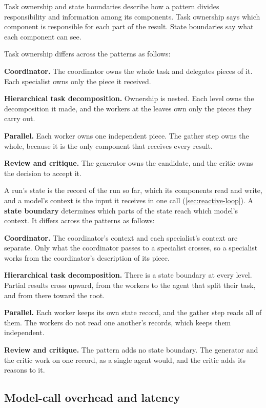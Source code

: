 Task ownership and state boundaries describe how a pattern divides responsibility and information
among its components. Task ownership says which component is responsible for each part of the
result. State boundaries say what each component can see.

Task ownership differs across the patterns as follows:
\bi
\item \textbf{Coordinator.} The coordinator owns the whole task and delegates pieces of it. Each
specialist owns only the piece it received.
\item \textbf{Hierarchical task decomposition.} Ownership is nested. Each level owns the
decomposition it made, and the workers at the leaves own only the pieces they carry out.
\item \textbf{Parallel.} Each worker owns one independent piece. The gather step owns the whole,
because it is the only component that receives every result.
\item \textbf{Review and critique.} The generator owns the candidate, and the critic owns the
decision to accept it.
\ei

A run's state is the record of the run so far, which its components read and write, and a model's
context is the input it receives in one call (\cref{sec:reactive-loop}). A \textbf{state boundary} determines which parts of the state reach which model's context. It differs
across the patterns as follows:
\bi
\item \textbf{Coordinator.} The coordinator's context and each specialist's context are separate.
Only what the coordinator passes to a specialist crosses, so a specialist works from the
coordinator's description of its piece.
\item \textbf{Hierarchical task decomposition.} There is a state boundary at every level. Partial
results cross upward, from the workers to the agent that split their task, and from there toward
the root.
\item \textbf{Parallel.} Each worker keeps its own state record, and the gather step reads all of
them. The workers do not read one another's records, which keeps them independent.
\item \textbf{Review and critique.} The pattern adds no state boundary. The generator and the
critic work on one record, as a single agent would, and the critic adds its reasons to it.
\ei

\subsection{Model-call overhead and latency}
\label{sec:patterns-cost}

